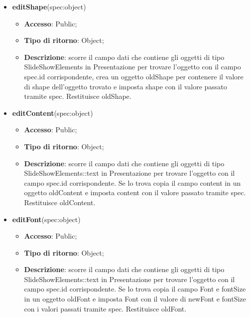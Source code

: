 {\begin{itemize}
\begin{itemize}
				\item \textbf{Descrizione}: scorre il campo dati che contiene gli oggetti di tipo SlideShowElements in Presentazione per trovare l’oggetto con il campo spec.id corrispondente, crea un oggetto oldColor per contenere il valore di color dell’oggetto trovato e imposta color con il valore passato tramite spec. Restituisce oldColor.
			\end{itemize}
			\item \textbf{editShape}(spec:object)
			\begin{itemize}
				\item \textbf{Accesso}: Public;
				\item \textbf{Tipo di ritorno}: Object;
				\item \textbf{Descrizione}: scorre il campo dati che contiene gli oggetti di tipo SlideShowElements in Presentazione per trovare l’oggetto con il campo spec.id corrispondente, crea un oggetto oldShape per contenere il valore di shape dell’oggetto trovato e imposta shape con il valore passato tramite spec. Restituisce oldShape.
			\end{itemize}
			\item \textbf{editContent}(spec:object)
			\begin{itemize}
				\item \textbf{Accesso}: Public;
				\item \textbf{Tipo di ritorno}: Object;
				\item \textbf{Descrizione}: scorre il campo dati che contiene gli oggetti di tipo SlideShowElements::text in Presentazione per trovare l’oggetto con il campo spec.id corrispondente. Se lo trova copia il campo content in un oggetto oldContent e imposta content con il valore passato tramite spec. Restituisce oldContent.
			\end{itemize}
			\item \textbf{editFont}(spec:object)
			\begin{itemize}
				\item \textbf{Accesso}: Public;
				\item \textbf{Tipo di ritorno}: Object;
				\item \textbf{Descrizione}: scorre il campo dati che contiene gli oggetti di tipo SlideShowElements::text in Presentazione per trovare l’oggetto con il campo spec.id corrispondente. Se lo trova copia il campo Font e fontSize in un oggetto oldFont e imposta Font con il valore di newFont e fontSize con i valori passati tramite spec. Restituisce oldFont.
			\end{itemize}

\end{itemize}}
